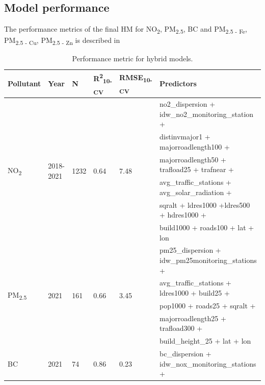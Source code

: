 \documentclass{article}
\begin{document}
\clearpage
\begin{samepage}
\subsection{Model performance}
The performance metrics of the final HM for NO\textsubscript{2}, PM\textsubscript{2.5}, BC and PM\textsubscript{2.5 - Fe}, PM\textsubscript{2.5 - Cu}, PM\textsubscript{2.5 - Zn} is described in \textbf{}

\begin{table}[!htbp]
\caption{Performance metric for hybrid models.}
\label{Table S4}
\centering
\begin{threeparttable}
\small %
\begin{tabular}{llllll}
\toprule
\textbf{Pollutant} & \textbf{Year} & \textbf{N} & \textbf{R\textsuperscript{2}\textsubscript{10-CV}} & \textbf{RMSE\textsubscript{10-CV}} & \textbf{Predictors}\tnote{2} \\
\midrule
\multirow{6}{*}{NO\textsubscript{2}} & \multirow{6}{*}{2018-2021} & \multirow{6}{*}{1232} & \multirow{6}{*}{0.64} & \multirow{6}{*}{7.48} & no2\_dispersion +  idw\_no2\_monitoring\_station + \\
 & & & & & distinvmajor1 + majorroadlength100 + \\
 & & & & & majorroadlength50 + trafload25 + trafnear + \\ 
 & & & & & avg\_traffic\_stations + avg\_solar\_radiation + \\ 
 & & & & & sqralt + ldres1000 +ldres500 + hdres1000 + \\
 & & & & & build1000 + roads100 + lat + lon \\
\midrule
\multirow{5}{*}{PM\textsubscript{2.5}} & \multirow{5}{*}{2021} & \multirow{5}{*}{161} & \multirow{5}{*}{0.66} & \multirow{5}{*}{3.45} & pm25\_dispersion + idw\_pm25monitoring\_stations + \\
& & & & & avg\_traffic\_stations + ldres1000 + build25 + \\
& & & & & pop1000 + roads25 + sqralt  + \\
& & & & &  majorroadlength25 + trafload300 + \\
& & & & & build\_height\_25 + lat + lon \\
\midrule
\multirow{6}{*}{BC} & \multirow{6}{*}{2021} &\multirow{6}{*}{74} & \multirow{6}{*}{0.86} & \multirow{6}{*}{0.23} & bc\_dispersion + idw\_nox\_monitoring\_stations +\\ 

\end{tabular}
\end{threeparttable}
\end{table}
\end{samepage}
\end{document}
